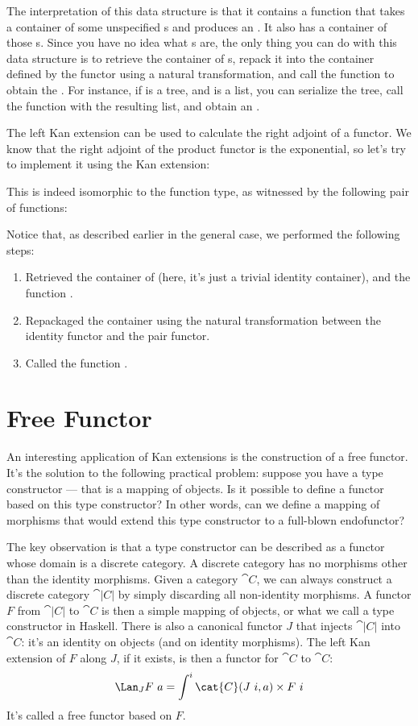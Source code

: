 The interpretation of this data structure is that it contains a function
that takes a container of some unspecified s and produces an
. It also has a container of those s. Since you have
no idea what s are, the only thing you can do with this data
structure is to retrieve the container of s, repack it into
the container defined by the functor  using a natural
transformation, and call the function to obtain the . For
instance, if  is a tree, and  is a list, you can
serialize the tree, call the function with the resulting list, and
obtain an .

The left Kan extension can be used to calculate the right adjoint of a
functor. We know that the right adjoint of the product functor is the
exponential, so let's try to implement it using the Kan extension:

This is indeed isomorphic to the function type, as witnessed by the
following pair of functions:

Notice that, as described earlier in the general case, we performed the
following steps:

\begin{enumerate}
\tightlist
\item
Retrieved the container of  (here, it's
just a trivial identity container), and the function .
\item
Repackaged the container using the natural transformation between the
identity functor and the pair functor.
\item
Called the function .
\end{enumerate}

\section{Free Functor}

An interesting application of Kan extensions is the construction of a
free functor. It's the solution to the following practical problem:
suppose you have a type constructor --- that is a mapping of objects. Is
it possible to define a functor based on this type constructor? In other
words, can we define a mapping of morphisms that would extend this type
constructor to a full-blown endofunctor?

The key observation is that a type constructor can be described as a
functor whose domain is a discrete category. A discrete category has no
morphisms other than the identity morphisms. Given a category $\cat{C}$,
we can always construct a discrete category $\cat{|C|}$
by simply discarding all non-identity morphisms. A functor $F$
from $\cat{|C|}$ to $\cat{C}$ is then a simple mapping
of objects, or what we call a type constructor in Haskell. There is also
a canonical functor $J$ that injects $\cat{|C|}$
into $\cat{C}$: it's an identity on objects (and on identity morphisms).
The left Kan extension of $F$ along $J$, if it exists, is
then a functor for $\cat{C}$ to $\cat{C}$:
\[\Lan_{J}F\ a = \int^i \cat{C}(J\ i, a)\times{}F\ i\]
It's called a free functor based on $F$.

